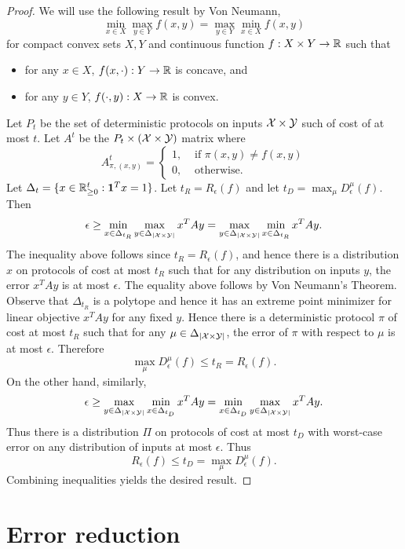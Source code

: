\begin{proof}
We will use the following result by Von Neumann,
$$\min_{x\in X}\max_{y\in Y} f(x,y) = \max_{y \in Y} \min_{x \in X} f(x,y)$$
for compact convex sets $X,Y$ and continuous function $f: X\times Y \rightarrow \mathbb{R}$ such that 
\begin{itemize}
    \item for any $x \in X$, $f(x,\cdot): Y\rightarrow \mathbb{R}$ is concave, and
    \item for any $y \in Y$, $f(\cdot, y): X\rightarrow \mathbb{R}$ is convex.
\end{itemize}
Let $P_t$ be the set of deterministic protocols on inputs $\mathcal{X} \times \mathcal{Y}$ such of cost of at most $t$. Let $A^t$ be the $P_t \times (\mathcal{X}\times\mathcal{Y})$ matrix where 
$$A^t_{\pi, (x,y)} = \begin{cases}
1, &\text{ if } \pi(x,y) \neq f(x,y) \\
0, &\text{ otherwise.}
\end{cases}$$
Let $\Delta_t = \{x \in \mathbb{R}^t_{\geq 0} : \mathbf{1}^Tx = 1\}$. Let $t_R = R_\epsilon(f)$ and let $t_D = \max_\mu D^\mu_\epsilon(f).$ Then
$$\epsilon \geq \min_{x \in \Delta_{t_R}} \max_{y \in \Delta_{|\mathcal{X}\times\mathcal{Y}|}}x^TAy =\max_{y \in \Delta_{|\mathcal{X}\times\mathcal{Y}|}} \min_{x \in \Delta_{t_R}} x^TAy.$$
The inequality above follows since $t_R = R_\epsilon (f)$, and hence there is a distribution $x$ on protocols of cost at  most $t_R$ such that for any distribution on inputs $y$, the error $x^TAy$ is at most $\epsilon$. The equality above follows by Von Neumann's Theorem. Observe that $\Delta_{t_R}$ is a polytope and hence it has an extreme point minimizer for linear objective $x^TAy$ for any fixed $y$. Hence there is a deterministic protocol $\pi$ of cost at most $t_R$ such that for any $\mu \in \Delta_{|\mathcal{X}\times \mathcal{Y}|}$, the error of $\pi$ with respect to $\mu$ is at most $\epsilon$. Therefore
$$\max_{\mu} D^\mu_{\epsilon}(f) \leq t_R = R_\epsilon(f).$$ 
On the other hand, similarly,
$$\epsilon \geq \max_{y \in \Delta_{|\mathcal{X}\times\mathcal{Y}|}} \min_{x \in \Delta_{t_D}} x^TAy  =  \min_{x \in \Delta_{t_D}} \max_{y \in \Delta_{|\mathcal{X}\times\mathcal{Y}|}}x^TAy.$$
Thus there is a distribution $\Pi$ on protocols of cost at most $t_D$ with worst-case error on any distribution of inputs at most $\epsilon$. Thus
$$R_\epsilon(f) \leq t_D = \max_\mu D^\mu_\epsilon(f).$$
Combining inequalities yields the desired result.
\end{proof}


\newpage 
\section{Error reduction}

